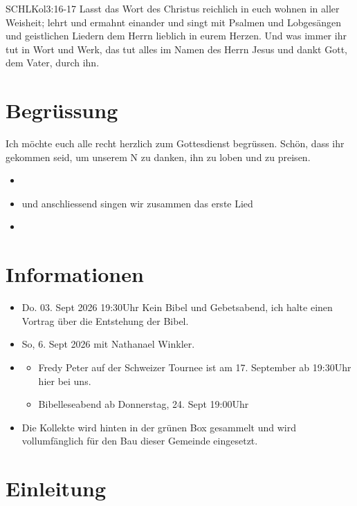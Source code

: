 \documentclass[fontsize=14pt]{mybib}
\author{OTS}
\begin{document}
\begin{bibelbox}{SCHL}{Kol}{3:16-17}
    Lasst das Wort des Christus reichlich in euch wohnen in aller Weisheit; lehrt und ermahnt einander und singt mit Psalmen und Lobgesängen und geistlichen Liedern dem Herrn lieblich in eurem Herzen. Und was immer ihr tut in Wort und Werk, das tut alles im Namen des Herrn Jesus und dankt Gott, dem Vater, durch ihn.
\end{bibelbox}
\section{Begrüssung}
Ich möchte euch alle recht herzlich zum Gottesdienst begrüssen. Schön, dass ihr gekommen seid, um unserem \herr N zu danken, ihn zu loben und zu preisen. 

\begin{itemize}
    \item {}
    \item und anschliessend singen wir zusammen das erste Lied
    \item {}
\end{itemize}

\section{Informationen}
\begin{itemize}
    \item {} Do. 03. Sept 2026 19:30Uhr Kein Bibel und Gebetsabend, ich halte einen Vortrag über die Entstehung der Bibel.\\
    \item {} So, 6. Sept 2026 mit Nathanael Winkler.
    
    \item {} 
    \begin{itemize}
        \item Fredy Peter auf der Schweizer Tournee ist am 17. September ab 19:30Uhr hier bei uns.
        \item Bibelleseabend ab Donnerstag, 24. Sept 19:00Uhr
    \end{itemize}        
    \item {} Die Kollekte wird hinten in der grünen Box gesammelt und wird vollumfänglich für den Bau dieser Gemeinde eingesetzt.
\end{itemize}
\section{Einleitung}
\end{document}
